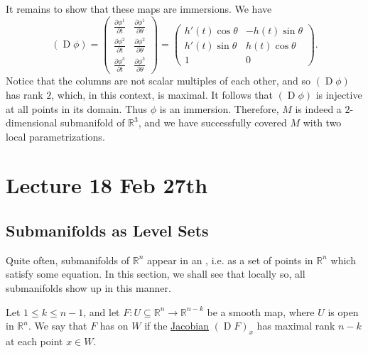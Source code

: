 \documentclass[notoc,notitlepage]{tufte-book}
\DeclareMathOperator{\D}{D}
\begin{document}
It remains to show that these maps are immersions. We have
\begin{equation*}
  (\D \phi) = \begin{pmatrix}
    \frac{\partial \phi^1}{\partial t} & \frac{\partial \phi^1}{\partial \theta}
    \\
    \frac{\partial \phi^2}{\partial t} & \frac{\partial \phi^2}{\partial \theta}
    \\
    \frac{\partial \phi^3}{\partial t} & \frac{\partial \phi^3}{\partial \theta}
  \end{pmatrix} = \begin{pmatrix}
    h'(t) \cos \theta & - h(t) \sin \theta \\
    h'(t) \sin \theta & h(t) \cos \theta \\
    1                 & 0
  \end{pmatrix}.
\end{equation*}
Notice that the columns are not scalar multiples of each other, and so $(\D
\phi)$ has rank $2$, which, in this context, is maximal. It follows that $(\D
\phi)$ is injective at all points in its domain. Thus $\phi$ is an immersion.
Therefore, $M$ is indeed a $2$-dimensional submanifold of $\mathbb{R}^3$, and we
have successfully covered $M$ with two local parametrizations.



\chapter{Lecture 18 Feb 27th}%
\label{chp:lecture_18_feb_27th}

\section{Submanifolds as Level Sets}%
\label{sec:submanifolds_as_level_sets}

Quite often, submanifolds of $\mathbb{R}^n$ appear in an ,
i.e. as a set of points in $\mathbb{R}^n$ which satisfy some equation. In this
section, we shall see that locally so, all submanifolds show up in this manner.

\begin{defn}\label{defn:maximal_rank}
  Let $1 \leq k \leq n - 1$, and let $F : U \subseteq \mathbb{R}^n \to
  \mathbb{R}^{n - k}$ be a smooth map, where $U$ is open in $\mathbb{R}^n$. We
  say that $F$ has  on $W$ if the
  \hyperref[defn:differential]{Jacobian} $(\D F)_{x}$ has maximal rank $n - k$
  at each point $x \in W$.
\end{defn}
\end{document}
